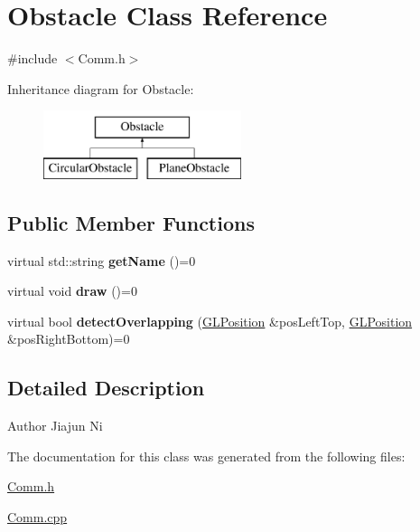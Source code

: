 \hypertarget{classObstacle}{\section{Obstacle Class Reference}
\label{classObstacle}
}


{\ttfamily \#include $<$Comm.\-h$>$}

Inheritance diagram for Obstacle\-:\begin{figure}[H]
\begin{center}
\leavevmode
\includegraphics[height=2.000000cm]{classObstacle}
\end{center}
\end{figure}
\subsection*{Public Member Functions}
\begin{DoxyCompactItemize}
\item 
\hypertarget{classObstacle_a81bb683cec57e04b78e654f56a859e82}{virtual std\-::string {\bfseries get\-Name} ()=0}\label{classObstacle_a81bb683cec57e04b78e654f56a859e82}

\item 
\hypertarget{classObstacle_a09d79e8826f6473e40740c2db16720de}{virtual void {\bfseries draw} ()=0}\label{classObstacle_a09d79e8826f6473e40740c2db16720de}

\item 
\hypertarget{classObstacle_a8b6170ad3e160ece18005577df73bdc1}{virtual bool {\bfseries detect\-Overlapping} (\hyperlink{structGLPosition}{G\-L\-Position} \&pos\-Left\-Top, \hyperlink{structGLPosition}{G\-L\-Position} \&pos\-Right\-Bottom)=0}\label{classObstacle_a8b6170ad3e160ece18005577df73bdc1}

\end{DoxyCompactItemize}


\subsection{Detailed Description}
\begin{DoxyAuthor}{Author}
Jiajun Ni 
\end{DoxyAuthor}


The documentation for this class was generated from the following files\-:\begin{DoxyCompactItemize}
\item 
\hyperlink{Comm_8h}{Comm.\-h}\item 
\hyperlink{Comm_8cpp}{Comm.\-cpp}\end{DoxyCompactItemize}
